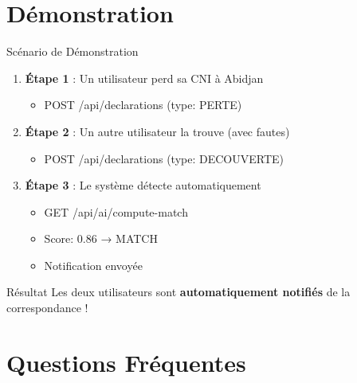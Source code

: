 \documentclass[aspectratio=169]{beamer}
\begin{document}
\section{Démonstration}

\begin{frame}{Scénario de Démonstration}
    \begin{enumerate}
        \item \textbf{Étape 1} : Un utilisateur perd sa CNI à Abidjan
        \begin{itemize}
            \item POST /api/declarations (type: PERTE)
        \end{itemize}

        \vspace{0.3cm}

        \item \textbf{Étape 2} : Un autre utilisateur la trouve (avec fautes)
        \begin{itemize}
            \item POST /api/declarations (type: DECOUVERTE)
        \end{itemize}

        \vspace{0.3cm}

        \item \textbf{Étape 3} : Le système détecte automatiquement
        \begin{itemize}
            \item GET /api/ai/compute-match
            \item Score: 0.86 → \textcolor{vertSucces}{\faCheckCircle} MATCH
            \item Notification envoyée
        \end{itemize}
    \end{enumerate}

    \vspace{0.3cm}

    \begin{alertblock}{Résultat}
        Les deux utilisateurs sont \textbf{automatiquement notifiés} de la correspondance !
    \end{alertblock}
\end{frame}

\section{Questions Fréquentes}
\end{document}
